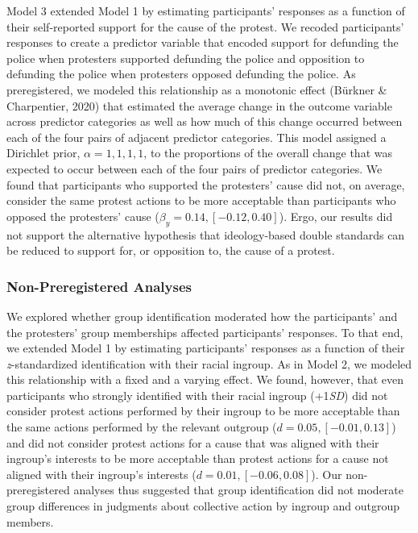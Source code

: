 \documentclass[12pt, letterpaper]{article}
\begin{document}
Model 3 extended Model 1 by estimating participants' responses as a
function of their self-reported support for the cause of the protest. We
recoded participants' responses to create a predictor variable that
encoded support for defunding the police when protesters supported
defunding the police and opposition to defunding the police when
protesters opposed defunding the police. As preregistered, we modeled
this relationship as a monotonic effect (Bürkner \& Charpentier, 2020)
that estimated the average change in the outcome variable across
predictor categories as well as how much of this change occurred between
each of the four pairs of adjacent predictor categories. This model
assigned a Dirichlet prior, \(\alpha = {1, 1, 1, 1}\), to the
proportions of the overall change that was expected to occur between
each of the four pairs of predictor categories. We found that
participants who supported the protesters' cause did not, on average,
consider the same protest actions to be more acceptable than
participants who opposed the protesters' cause
(\(\beta_{y} = 0.14, [-0.12, 0.40]\)). Ergo, our results did not support
the alternative hypothesis that ideology-based double standards can be
reduced to support for, or opposition to, the cause of a protest.

\hypertarget{non-preregistered-analyses-1}{%
\subsubsection{Non-Preregistered
Analyses}\label{non-preregistered-analyses-1}}

We explored whether group identification moderated how the participants'
and the protesters' group memberships affected participants' responses.
To that end, we extended Model 1 by estimating participants' responses
as a function of their \emph{z}-standardized identification with their
racial ingroup. As in Model 2, we modeled this relationship with a fixed
and a varying effect. We found, however, that even participants who
strongly identified with their racial ingroup (+1\emph{SD}) did not
consider protest actions performed by their ingroup to be more
acceptable than the same actions performed by the relevant outgroup
(\(d = 0.05, [-0.01, 0.13]\)) and did not consider protest actions for a
cause that was aligned with their ingroup's interests to be more
acceptable than protest actions for a cause not aligned with their
ingroup's interests (\(d = 0.01, [-0.06, 0.08]\)). Our non-preregistered
analyses thus suggested that group identification did not moderate group
differences in judgments about collective action by ingroup and outgroup
members.
\end{document}
